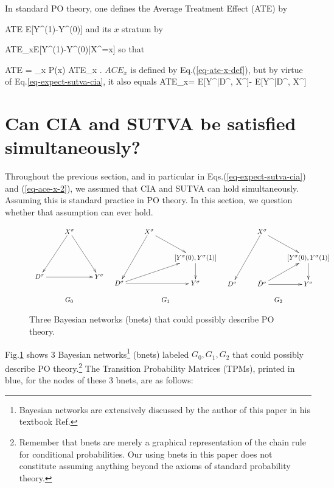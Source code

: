 \documentclass[12pt]{article}
\begin{document}
In standard PO theory, one defines the
Average Treatment Effect (ATE) by

\beq
ATE \eqdef E[Y^\s(1)-Y^\s(0)]
\eeq
and its $x$ stratum by

\beq
ATE_x\eqdef E[Y^\s(1)-Y^\s(0)|X^\s=x]
\;
\label{eq-ate-x-def}
\eeq
so that

\beq
ATE =
\sum_x P(x) ATE_x
\;.
\eeq
$ACE_x$ is defined by 
Eq.(\ref{eq-ate-x-def}),
but by virtue of
 Eq.\ref{eq-expect-sutva-cia},
it also equals
\beq
ATE_x=
E[Y^\s|D^, X^\s]-
E[Y^\s|D^, X^\s]
\label{eq-ace-x-2}
\eeq


\section{Can CIA and SUTVA be satisfied
simultaneously?}

Throughout the previous section,
and in
particular in 
Eqs.(\ref{eq-expect-sutva-cia})
and (\ref{eq-ace-x-2}),
we assumed that CIA and SUTVA
can hold simultaneously.
Assuming this is
standard 
practice in PO 
theory.
In this section,
we question 
whether that
assumption
can ever hold.





\begin{figure}[h!]
$$
\begin{array}{ccccc}
\xymatrix{
&X^\s\ar[ddl]\ar[ddr]
\\
\\
D^\s\ar[rr]&&Y^\s
}
&
\xymatrix{
&X^\s\ar[ddl]\ar[dr]
\\
&&[Y^\s(0),Y^\s(1)]\ar[d]
\\
D^\s
\ar[rr]
\ar[urr]&&Y^\s
}
&
\xymatrix{
&X^\s\ar[ddl]\ar[dr]
\\
&&[Y^\s(0),Y^\s(1)]\ar[d]
\\
D^\s&\tD^\s\ar[r]\ar[ur]
&Y^\s
}
\\
\\
G_0&G_1&G_2
\end{array}
$$
\caption{Three Bayesian networks (bnets)
that could possibly describe PO theory.
} 
\label{fig-po-G-im-y0-y1}
\end{figure}

Fig.\ref{fig-po-G-im-y0-y1}
shows 3 Bayesian networks\footnote{Bayesian 
networks are extensively
discussed 
by the author of this paper
in his textbook Ref.\cite{bayesuvius}
} (bnets)
labeled   $G_0, G_1, G_2$
that could possibly
describe PO theory.\footnote{Remember
 that bnets are 
merely a graphical
representation
of the chain rule
for conditional
probabilities.
Our using bnets
in this paper
does not 
constitute 
assuming anything
beyond the axioms
of standard probability theory.}
The Transition
Probability Matrices (TPMs),
printed in blue,
for the nodes of these 3 bnets, are
as follows:
\end{document}

